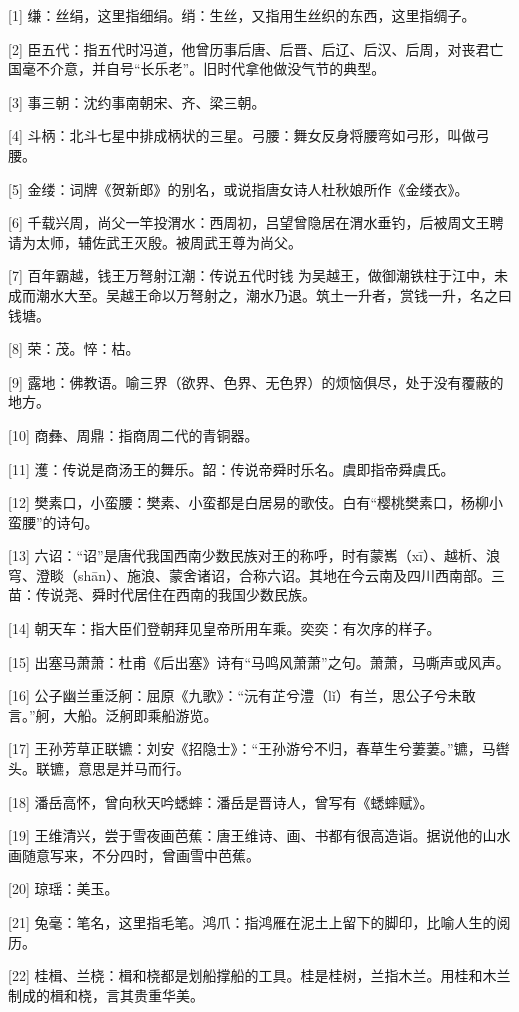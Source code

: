 \documentclass[12pt,UTF8]{ctexbook}
\begin{document}
[1] 缣：丝绢，这里指细绢。绡：生丝，又指用生丝织的东西，这里指绸子。

[2] 臣五代：指五代时冯道，他曾历事后唐、后晋、后辽、后汉、后周，对丧君亡国毫不介意，并自号“长乐老”。旧时代拿他做没气节的典型。

[3] 事三朝：沈约事南朝宋、齐、梁三朝。

[4] 斗柄：北斗七星中排成柄状的三星。弓腰：舞女反身将腰弯如弓形，叫做弓腰。

[5] 金缕：词牌《贺新郎》的别名，或说指唐女诗人杜秋娘所作《金缕衣》。

[6] 千载兴周，尚父一竿投渭水：西周初，吕望曾隐居在渭水垂钓，后被周文王聘请为太师，辅佐武王灭殷。被周武王尊为尚父。

[7] 百年霸越，钱王万弩射江潮：传说五代时钱 为吴越王，做御潮铁柱于江中，未成而潮水大至。吴越王命以万弩射之，潮水乃退。筑土一升者，赏钱一升，名之曰钱塘。

[8] 荣：茂。悴：枯。

[9] 露地：佛教语。喻三界（欲界、色界、无色界）的烦恼俱尽，处于没有覆蔽的地方。

[10] 商彝、周鼎：指商周二代的青铜器。

[11] 濩：传说是商汤王的舞乐。韶：传说帝舜时乐名。虞即指帝舜虞氏。

[12] 樊素口，小蛮腰：樊素、小蛮都是白居易的歌伎。白有“樱桃樊素口，杨柳小蛮腰”的诗句。

[13] 六诏：“诏”是唐代我国西南少数民族对王的称呼，时有蒙嶲（xī）、越析、浪穹、澄睒（shān）、施浪、蒙舍诸诏，合称六诏。其地在今云南及四川西南部。三苗：传说尧、舜时代居住在西南的我国少数民族。

[14] 朝天车：指大臣们登朝拜见皇帝所用车乘。奕奕：有次序的样子。

[15] 出塞马萧萧：杜甫《后出塞》诗有“马鸣风萧萧”之句。萧萧，马嘶声或风声。

[16] 公子幽兰重泛舸：屈原《九歌》：“沅有芷兮澧（lǐ）有兰，思公子兮未敢言。”舸，大船。泛舸即乘船游览。

[17] 王孙芳草正联镳：刘安《招隐士》：“王孙游兮不归，春草生兮萋萋。”镳，马辔头。联镳，意思是并马而行。

[18] 潘岳高怀，曾向秋天吟蟋蟀：潘岳是晋诗人，曾写有《蟋蟀赋》。

[19] 王维清兴，尝于雪夜画芭蕉：唐王维诗、画、书都有很高造诣。据说他的山水画随意写来，不分四时，曾画雪中芭蕉。

[20] 琼瑶：美玉。

[21] 兔毫：笔名，这里指毛笔。鸿爪：指鸿雁在泥土上留下的脚印，比喻人生的阅历。

[22] 桂楫、兰桡：楫和桡都是划船撑船的工具。桂是桂树，兰指木兰。用桂和木兰制成的楫和桡，言其贵重华美。
\end{document}
